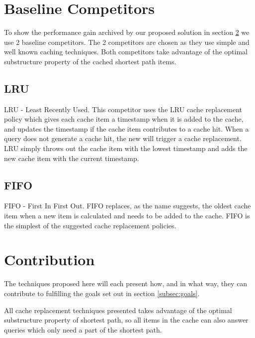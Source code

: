 \section{Baseline Competitors}
To show the performance gain archived by our proposed solution in section \ref{sec:contribution} we use 2 baseline competitors.
The 2 competitors are chosen as they use simple and well known caching techniques. Both competitors take advantage of the optimal substructure property of the cached shortest path items.

\subsection{LRU}

LRU - Least Recently Used. This competitor uses the LRU cache replacement policy which gives each cache item a timestamp when it is added to the cache, and updates the timestamp if the cache item contributes to a cache hit. When a \spath query does not generate a cache hit, the new \spath will trigger a cache replacement. LRU simply throws out the cache item with the lowest timestamp and adds the new cache item with the current timestamp.

\subsection{FIFO}

FIFO - First In First Out. FIFO replaces, as the name suggests, the oldest cache item when a new \spath item is calculated and needs to be added to the cache. FIFO is the simplest of the suggested cache replacement policies.




\section{Contribution} \label{sec:contribution}

The techniques proposed here will each present how, and in what way, they can contribute to fulfilling the goals set out in section \ref{subsec:goals}.

All cache replacement techniques presented takes advantage of the optimal substructure property of shortest path, so all items in the \spath cache can also answer queries which only need a part of the shortest path.

